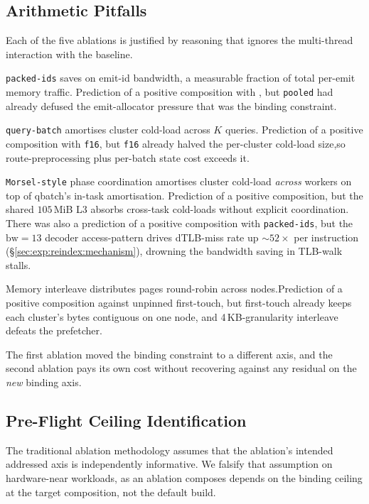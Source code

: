 \subsection{Arithmetic Pitfalls\label{sec:exp:negcomp:arithmetic}}

Each of the five ablations is justified by reasoning that ignores the multi-thread interaction with the baseline.

\texttt{packed-ids} saves on emit-id bandwidth, a measurable fraction of total per-emit memory traffic. Prediction of a positive composition with \bcombo{}, but \texttt{pooled} had already defused the emit-allocator pressure that was the binding constraint.

\texttt{query-batch} amortises cluster cold-load across $K$ queries. Prediction of a positive composition with \texttt{f16}, but \texttt{f16} already halved the per-cluster cold-load size,so route-preprocessing plus per-batch state cost exceeds it. 

\texttt{Morsel-style}  phase coordination amortises cluster cold-load \emph{across} workers on top of qbatch's in-task amortisation. Prediction of a positive composition, but the shared $105$\,MiB L3 absorbs cross-task cold-loads without explicit coordination. There was also a prediction of a positive composition with \texttt{packed-ids}, but the $\text{bw}{=}13$ decoder access-pattern drives dTLB-miss rate up $\sim\!52\times$ per instruction (§\ref{sec:exp:reindex:mechanism}), drowning the bandwidth saving in TLB-walk stalls. 

Memory interleave distributes pages round-robin across nodes.Prediction of a positive composition against unpinned first-touch, but first-touch already keeps each cluster's bytes contiguous on one node, and 4\,KB-granularity interleave defeats the prefetcher.

The first ablation moved the binding constraint to a different axis, and the second ablation pays its own cost without recovering against any residual on the \emph{new} binding axis.

\subsection{Pre-Flight Ceiling Identification\label{sec:exp:negcomp:preflight}}

The traditional ablation methodology assumes that the ablation's intended addressed axis is independently informative. We falsify that assumption on hardware-near workloads, as an ablation composes depends on the binding ceiling at the target composition, not the default build.

